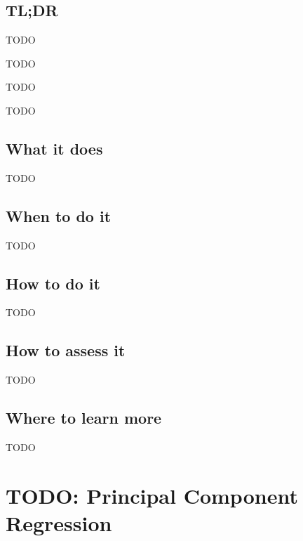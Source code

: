 \documentclass[
]{book}
\providecommand{\tightlist}{%
  \setlength{\itemsep}{0pt}\setlength{\parskip}{0pt}}
\begin{document}
\hypertarget{tldr-13}{%
\section{TL;DR}\label{tldr-13}}

\begin{description}
\tightlist
\item[What it does]
TODO
\item[When to do it]
TODO
\item[How to do it]
TODO
\item[How to assess it]
TODO
\end{description}

\hypertarget{what-it-does-13}{%
\section{What it does}\label{what-it-does-13}}

TODO

\hypertarget{when-to-do-it-13}{%
\section{When to do it}\label{when-to-do-it-13}}

TODO

\hypertarget{how-to-do-it-13}{%
\section{How to do it}\label{how-to-do-it-13}}

TODO

\hypertarget{how-to-assess-it-13}{%
\section{How to assess it}\label{how-to-assess-it-13}}

TODO

\hypertarget{where-to-learn-more-13}{%
\section{Where to learn more}\label{where-to-learn-more-13}}

TODO

\hypertarget{principal-component-regression}{%
\chapter{TODO: Principal Component Regression}\label{principal-component-regression}}
\end{document}
